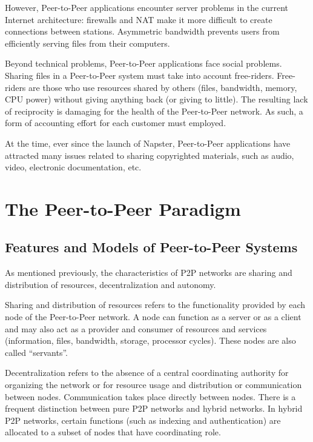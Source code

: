 However, Peer-to-Peer applications encounter server problems in the current
Internet architecture: firewalls and NAT make it more difficult to create
connections between stations. Asymmetric bandwidth prevents users from
efficiently serving files from their computers.

Beyond technical problems, Peer-to-Peer applications face social problems.
Sharing files in a Peer-to-Peer system must take into account free-riders.
Free-riders are those who use resources shared by others (files, bandwidth,
memory, CPU power) without giving anything back (or giving to little). The
resulting lack of reciprocity is damaging for the health of the Peer-to-Peer
network. As such, a form of accounting effort for each customer must employed.

At the time, ever since the launch of Napster, Peer-to-Peer applications have
attracted many issues related to sharing copyrighted materials, such as audio,
video, electronic documentation, etc.

\section{The Peer-to-Peer Paradigm}
\label{sec:p2p-systems:paragigm}

\subsection{Features and Models of Peer-to-Peer Systems}

As mentioned previously, the characteristics of P2P networks are sharing and
distribution of resources, decentralization and autonomy.

Sharing and distribution of resources refers to the functionality provided by
each node of the Peer-to-Peer network. A node can function as a server or as a
client and may also act as a provider and consumer of resources and
services (information, files, bandwidth, storage, processor cycles). These
nodes are also called ``servants''.

Decentralization refers to the absence of a central coordinating authority for
organizing the network or for resource usage and distribution or communication
between nodes. Communication takes place directly between nodes. There is a
frequent distinction between pure P2P networks and hybrid networks. In
hybrid P2P networks, certain functions (such as indexing and authentication)
are allocated to a subset of nodes that have coordinating role.

